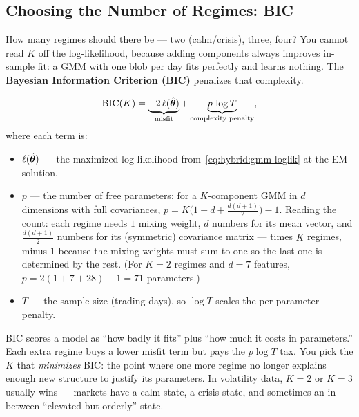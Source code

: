 \subsection{Choosing the Number of Regimes: BIC}
\label{sec:hybrid:bic}

How many regimes should there be --- two (calm/crisis), three, four?  You
cannot read $K$ off the log-likelihood, because adding components always
improves in-sample fit: a GMM with one blob per day fits perfectly and
learns nothing.  The \textbf{Bayesian Information Criterion (BIC)}
\citep{Schwarz1978} penalizes that complexity.

\begin{equation}\label{eq:hybrid:bic}
  \text{BIC}(K) = \underbrace{-2\,\ell(\hat{\bm{\theta}})}_{\text{misfit}}
    + \underbrace{p\,\log T}_{\text{complexity penalty}},
\end{equation}
where each term is:
\begin{itemize}
  \item $\ell(\hat{\bm{\theta}})$ --- the maximized log-likelihood
        from~\eqref{eq:hybrid:gmm-loglik} at the EM solution,
  \item $p$ --- the number of free parameters; for a $K$-component GMM in
        $d$ dimensions with full covariances,
        $p = K\bigl(1 + d + \tfrac{d(d+1)}{2}\bigr) - 1$.  Reading the
        count: each regime needs $1$ mixing weight, $d$ numbers for its
        mean vector, and $\tfrac{d(d+1)}{2}$ numbers for its (symmetric)
        covariance matrix --- times $K$ regimes, minus $1$ because the
        mixing weights must sum to one so the last one is determined by the
        rest.  (For $K=2$ regimes and $d=7$ features,
        $p = 2(1+7+28) - 1 = 71$ parameters.)
  \item $T$ --- the sample size (trading days), so $\log T$ scales the
        per-parameter penalty.
\end{itemize}

\begin{intuition}
BIC scores a model as ``how badly it fits'' plus ``how much it costs in
parameters.''  Each extra regime buys a lower misfit term but pays the
$p\log T$ tax.  You pick the $K$ that \emph{minimizes} BIC: the point where
one more regime no longer explains enough new structure to justify its
parameters.  In volatility data, $K=2$ or $K=3$ usually wins --- markets
have a calm state, a crisis state, and sometimes an in-between ``elevated
but orderly'' state.
\end{intuition}


